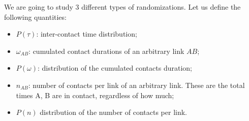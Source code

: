 \documentclass[../main/main.tex]{subfiles}
\begin{document}
We are going to study 3 different types of randomizations.
Let us define the following quantities:
\begin{itemize}
    \item $P(\tau)$: inter-contact time distribution;
    \item $\omega_{AB}$: cumulated contact durations of an arbitrary link $AB$;
    \item $P(\omega)$: distribution of the cumulated contacts duration;
    \item $n_{AB}$: number of contacts per link of an arbitrary link. These are the total times A, B are in contact, regardless of how much;
    \item $P(n)$ distribution of the number of contacts per link.
\end{itemize}


\begin{figure}[h!]
\begin{minipage}[c]{0.5\linewidth}
\end{minipage}
\begin{minipage}[]{0.5\linewidth}
\centering
{}
\end{minipage}\\
\begin{minipage}[c]{0.5\linewidth}

\end{minipage}
\end{figure}
\end{document}
